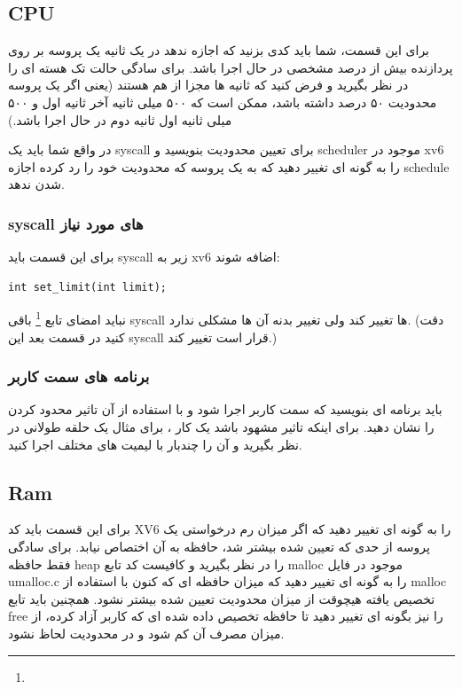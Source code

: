 \documentclass{article}
\begin{document}
		\subsection{CPU}
		برای این قسمت، شما باید کدی بزنید که اجازه ندهد در یک ثانیه یک پروسه  بر روی پردازنده بیش از درصد مشخصی در حال اجرا باشد.  برای سادگی حالت تک هسته ای را در نظر بگیرید و فرض کنید که ثانیه ها مجزا از هم هستند (یعنی اگر یک پروسه محدودیت ۵۰ درصد داشته باشد، ممکن است که ۵۰۰ میلی ثانیه آخر ثانیه اول و ۵۰۰ میلی ثانیه اول ثانیه دوم در حال اجرا باشد.)
		
		در واقع شما باید یک syscall برای تعیین محدودیت بنویسید و scheduler موجود در xv6 را به گونه ای تغییر دهید که  به یک پروسه که محدودیت خود را رد کرده  اجازه schedule شدن ندهد.
		
		\subsubsection{
			syscall
			های مورد نیاز
		}
		برای این قسمت باید syscall زیر به xv6 اضافه شوند:
		\begin{verbatim}
int set_limit(int limit);
		\end{verbatim}
		نباید امضای تابع
		\footnote{}
		باقی syscall ها تغییر کند ولی تغییر بدنه آن ها مشکلی ندارد. 
		(دقت کنید در قسمت بعد این syscall قرار است تغییر کند.)
		
		\subsubsection{
			برنامه های سمت کاربر
		}
		باید برنامه ای بنویسید که سمت کاربر اجرا شود و با استفاده از آن تاثیر محدود کردن  را نشان دهید. برای اینکه تاثیر مشهود باشد یک کار ، برای مثال یک حلقه  طولانی در نظر بگیرید و آن را چندبار با لیمیت های مختلف اجرا کنید.
		
		\subsection{Ram}
		برای این قسمت باید کد XV6 را به گونه ای تغییر دهید که اگر میزان رم درخواستی یک پروسه از حدی که تعیین شده بیشتر شد، حافظه به آن اختصاص نیابد. برای سادگی فقط حافظه heap را در نظر بگیرید و کافیست کد تابع malloc موجود در فایل umalloc.c را به گونه ای تغییر دهید که میزان حافظه ای که  کنون با استفاده از malloc تخصیص یافته هیچوقت از میزان محدودیت تعیین شده بیشتر نشود. همچنین باید تابع free را نیز بگونه ای تغییر دهید تا حافظه تخصیص داده شده ای که کاربر آزاد کرده، از میزان مصرف آن کم شود و در محدودیت لحاظ نشود. 
		
\end{document}
